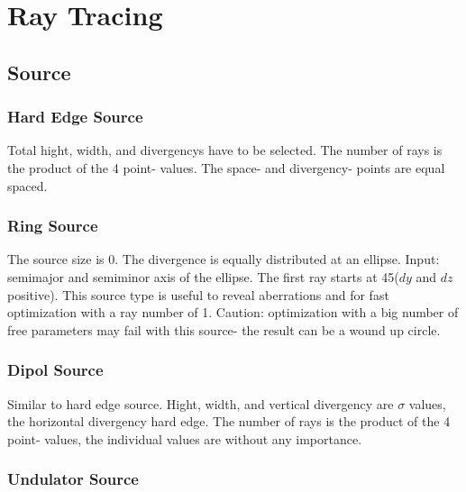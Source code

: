 



\chapter{Ray Tracing}   

\section{Source}
\subsection{Hard Edge Source} 
Total hight, width, and divergencys have to be selected. The number of rays is
the product of the 4 point- values.  The space- and divergency- points are
equal spaced.

\subsection{Ring Source} 
The source size is 0. The divergence is equally distributed at an
ellipse. Input: semimajor and semiminor axis of the ellipse. The first
ray starts at 45\grad ($dy$ and $dz$ positive). This source type is
useful to reveal aberrations and for fast optimization with a ray number of 1. Caution:
optimization with a big number of free parameters may fail with this
source- the result can be a wound up circle. 

\subsection{Dipol Source} 
Similar to hard edge source. Hight, width, and vertical divergency are $\sigma$
values, the horizontal divergency hard edge. The number of rays is
the product of the 4 point- values, the individual values are without any
importance.

\subsection{Undulator Source} 

